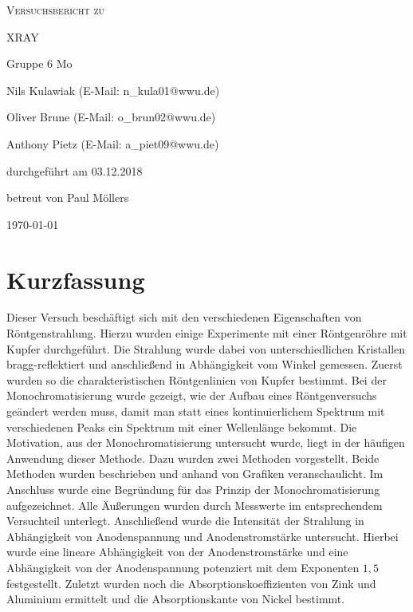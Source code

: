 \documentclass[
	a4paper,
	12pt,
	pagesize,
	ngerman
]{scrartcl}
\begin{document}
\begin{titlepage}
	\centering
	{\scshape\LARGE Versuchsbericht zu \par}
	\vspace{1cm}
	{\scshape\huge XRAY \par}
	\vspace{2.5cm}
	{\LARGE Gruppe 6 Mo\par}
	\vspace{0.5cm}
	{\large Nils Kulawiak (E-Mail: n\_kula01@wwu.de) \par}
	{\large Oliver Brune (E-Mail: o\_brun02@wwu.de) \par}
	{\large Anthony Pietz (E-Mail: a\_piet09@wwu.de) \par}
	\vfill
	durchgeführt am 03.12.2018\par
	
	\vfill
	betreut von Paul Möllers\par
	
	\vfill
	{\large \today\par}
\end{titlepage}

\tableofcontents
		
\newpage

\section{Kurzfassung}
Dieser Versuch beschäftigt sich mit den verschiedenen Eigenschaften von Röntgenstrahlung. Hierzu wurden einige Experimente mit einer Röntgenröhre mit Kupfer durchgeführt. Die Strahlung wurde dabei von unterschiedlichen Kristallen bragg-reflektiert und anschließend in Abhängigkeit vom Winkel gemessen. Zuerst wurden so die charakteristischen Röntgenlinien von Kupfer bestimmt.
Bei der Monochromatisierung wurde gezeigt, wie der Aufbau eines Röntgenversuchs geändert werden muss, damit man statt eines kontinuierlichem Spektrum mit verschiedenen Peaks ein Spektrum mit einer Wellenlänge bekommt. Die Motivation, aus der Monochromatisierung untersucht wurde, liegt in der häufigen Anwendung dieser Methode.
Dazu wurden zwei Methoden vorgestellt. Beide Methoden wurden beschrieben und anhand von Grafiken veranschaulicht. Im Anschluss wurde eine Begründung für das Prinzip der Monochromatisierung aufgezeichnet. Alle Äußerungen wurden durch Messwerte im entsprechendem Versuchteil unterlegt.
Anschließend wurde die Intensität der Strahlung in Abhängigkeit von Anodenspannung und Anodenstromstärke untersucht. Hierbei wurde eine lineare Abhängigkeit von der Anodenstromstärke und eine Abhängigkeit von der Anodenspannung potenziert mit dem Exponenten $1,5$ festgestellt.
Zuletzt wurden noch die Absorptionskoeffizienten von Zink und Aluminium ermittelt und die Absorptionskante von Nickel bestimmt.
\end{document}
